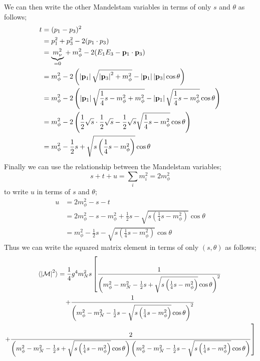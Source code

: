 \documentclass[10pt]{article}
\begin{document}
We can then write the other Mandelstam variables in terms of only $s$ and $\theta$ as follows;
\begin{align*}
t &= (p_1 - p_3)^2 \\
&= p_1^2 + p_3^2 - 2 (p_1 \cdot p_3) \\
&= \underset{=0}{\underbrace{m_\nu^2}} + m_\phi^2 - 2(E_1 E_3 - \mathbf{p}_1 \cdot \mathbf{p}_3) \\
&= m_\phi^2 - 2\left(\left| \mathbf{p}_1 \right|\sqrt{\left| \mathbf{p}_3 \right|^2 + m_\phi^2} - \left| \mathbf{p}_1 \right| \left| \mathbf{p}_3 \right|\cos \theta\right) \\
&= m_\phi^2 - 2\left(\left| \mathbf{p}_1 \right| \sqrt{\frac{1}{4}s - m_\phi^2 + m_\phi^2} - \left| \mathbf{p}_1 \right|\sqrt{\frac{1}{4}s - m_\phi^2}\cos\theta\right) \\
&= m_\phi^2 - 2\left(\frac{1}{2}\sqrt{s}\cdot\frac{1}{2}\sqrt{s} - \frac{1}{2}\sqrt{s}\sqrt{\frac{1}{4}s - m_\phi^2}\cos\theta\right) \\
&= m_\phi^2 - \frac{1}{2}s + \sqrt{s\left(\frac{1}{4}s - m_\phi^2\right)}\cos\theta
\end{align*}
Finally we can use the relationship between the Mandelstam variables;
\begin{equation}
s + t + u = \sum_{i}{m_i^2} = 2m_\phi^2
\end{equation}
to write $u$ in terms of $s$ and $\theta$;
\begin{align*}
u &= 2 m_\phi^2 - s - t \\
&= 2 m_\phi^2 - s - m_\phi^2 + \frac{1}{2}s - \sqrt{s\left(\frac{1}{4}s- m_\phi^2 \right)}\cos\theta \\
&= m_\phi^2 - \frac{1}{2}s - \sqrt{s\left(\frac{1}{4}s - m_\phi^2\right)}\cos\theta
\end{align*}
Thus we can write the squared matrix element in terms of only $(s, \theta)$ as follows;
\begin{multline}
\langle \left| \mathcal{M} \right|^2 \rangle = \frac{1}{4}g^4 m_N^2 s \left[ \frac{1}{\left(m_\phi^2 - m_N^2 - \frac{1}{2}s + \sqrt{s\left(\frac{1}{4}s - m_\phi^2\right)}\cos\theta\right)^2} \right. \\ \left. +  \frac{1}{\left(m_\phi^2 - m_N^2 - \frac{1}{2}s - \sqrt{s\left(\frac{1}{4}s - m_\phi^2\right)}\cos\theta\right)^2} \right. \\ \left. + \frac{2}{\left(m_\phi^2 - m_N^2 - \frac{1}{2}s + \sqrt{s\left(\frac{1}{4}s - m_\phi^2\right)}\cos\theta\right)\left(m_\phi^2 - m_N^2 - \frac{1}{2}s - \sqrt{s\left(\frac{1}{4}s - m_\phi^2\right)}\cos\theta\right)}  \right]
\end{multline}
\end{document}
